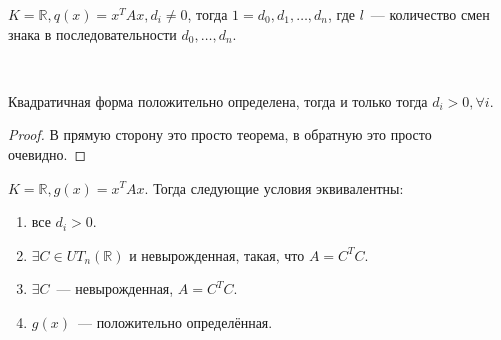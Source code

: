 \begin{follow}
    $K = \mathbb{R}, q(x) = x^T A x, d_i \not= 0$, тогда  $1 = d_0,d_1,\dots, d_n$, где $l$~--- количество смен знака в
    последовательности $d_0,\dots,d_n$.
\end{follow}
\\\quad
\begin{follow}
    Квадратичная форма положительно определена, тогда и только тогда $d_i > 0, \forall i$.
\end{follow}
\begin{proof}
    В прямую сторону это просто теорема, в обратную это просто очевидно.
\end{proof}
 \begin{theorem}
     $K = \mathbb{R}, g(x) = x^TAx.$ 
     Тогда следующие условия эквивалентны:
     \begin{enumerate}
         \item все $d_i > 0$.
         \item $\exists C \in UT_n(\mathbb{R})$ и невырожденная, такая, что $A = C^T C$.
         \item  $\exists C$~--- невырожденная, $A = C^T C$.
         \item  $g(x)$~--- положительно определённая.
     \end{enumerate}
\end{theorem}
